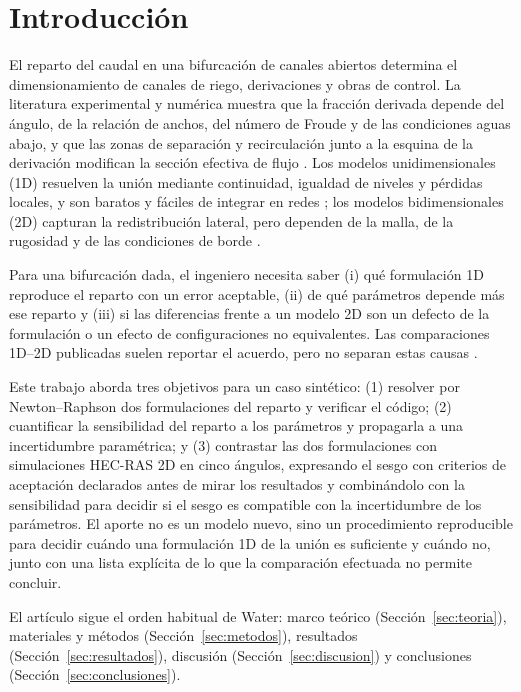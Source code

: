 \section{Introducción}
El reparto del caudal en una bifurcación de canales abiertos determina el dimensionamiento de canales de riego, derivaciones y obras de control. La literatura experimental y numérica muestra que la fracción derivada depende del ángulo, de la relación de anchos, del número de Froude y de las condiciones aguas abajo, y que las zonas de separación y recirculación junto a la esquina de la derivación modifican la sección efectiva de flujo \citep{ramamurthy1988,ramamurthy1990,hsu2002,momplot2017,ibrahim2022,gumgum2026}. Los modelos unidimensionales (1D) resuelven la unión mediante continuidad, igualdad de niveles y pérdidas locales, y son baratos y fáciles de integrar en redes \citep{chaudhry2008,chow1959}; los modelos bidimensionales (2D) capturan la redistribución lateral, pero dependen de la malla, de la rugosidad y de las condiciones de borde \citep{ghostine2012,ramamurthy2007}.

Para una bifurcación dada, el ingeniero necesita saber (i) qué formulación 1D reproduce el reparto con un error aceptable, (ii) de qué parámetros depende más ese reparto y (iii) si las diferencias frente a un modelo 2D son un defecto de la formulación o un efecto de configuraciones no equivalentes. Las comparaciones 1D--2D publicadas suelen reportar el acuerdo, pero no separan estas causas \citep{ghostine2012,gumgum2025}.

Este trabajo aborda tres objetivos para un caso sintético: (1) resolver por Newton--Raphson dos formulaciones del reparto y verificar el código; (2) cuantificar la sensibilidad del reparto a los parámetros y propagarla a una incertidumbre paramétrica; y (3) contrastar las dos formulaciones con simulaciones HEC-RAS 2D en cinco ángulos, expresando el sesgo con criterios de aceptación declarados antes de mirar los resultados y combinándolo con la sensibilidad para decidir si el sesgo es compatible con la incertidumbre de los parámetros. El aporte no es un modelo nuevo, sino un procedimiento reproducible para decidir cuándo una formulación 1D de la unión es suficiente y cuándo no, junto con una lista explícita de lo que la comparación efectuada no permite concluir.

El artículo sigue el orden habitual de Water: marco teórico (Sección~\ref{sec:teoria}), materiales y métodos (Sección~\ref{sec:metodos}), resultados (Sección~\ref{sec:resultados}), discusión (Sección~\ref{sec:discusion}) y conclusiones (Sección~\ref{sec:conclusiones}).

